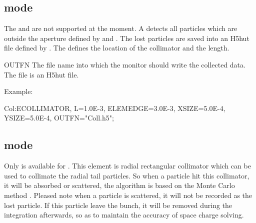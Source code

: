 \subsection{\opalt mode}
 The  and  are not supported at the moment. A  detects all particles which are outside the aperture defined by
 and . The lost particles are saved  into an H5hut file defined by .  The  defines the
location of the collimator and  the length.
\begin{kdescription}
\item[OUTFN]
  The file name into which the monitor should write the collected data. The file is an H5hut file.
\end{kdescription}

\noindent Example:
\begin{example}
Col:ECOLLIMATOR, L=1.0E-3, ELEMEDGE=3.0E-3, XSIZE=5.0E-4,
    YSIZE=5.0E-4, OUTFN="Coll.h5";
\end{example}


\subsection{\opalcycl mode}

Only  is available for \opalcycl.  This element is radial rectangular collimator which can be used to collimate the radial tail particles.
So when a particle hit this collimator, it will be absorbed or scattered, the algorithm is based on the Monte Carlo method .
Pleased note when a particle is scattered, it will not be recorded as the lost particle.
If this particle leave the bunch, it will be removed during the integration afterwards, so as to maintain the accuracy of space charge solving.

